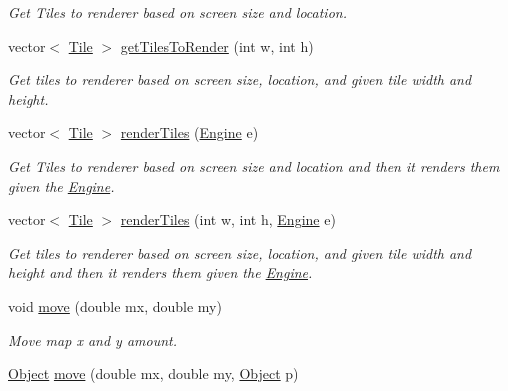 \begin{DoxyCompactItemize}
\begin{DoxyCompactList}\small\item\em Get Tiles to renderer based on screen size and location. \end{DoxyCompactList}\item 
vector$<$ \hyperlink{classTile}{Tile} $>$ \hyperlink{classTilesettmp_a042072ae7290cf0069ff9c776cf34903}{get\+Tiles\+To\+Render} (int w, int h)\hypertarget{classTilesettmp_a042072ae7290cf0069ff9c776cf34903}{}\label{classTilesettmp_a042072ae7290cf0069ff9c776cf34903}

\begin{DoxyCompactList}\small\item\em Get tiles to renderer based on screen size, location, and given tile width and height. \end{DoxyCompactList}\item 
vector$<$ \hyperlink{classTile}{Tile} $>$ \hyperlink{classTilesettmp_affbc3d29043e16afb7f99a4f3ec1dba8}{render\+Tiles} (\hyperlink{classEngine}{Engine} e)\hypertarget{classTilesettmp_affbc3d29043e16afb7f99a4f3ec1dba8}{}\label{classTilesettmp_affbc3d29043e16afb7f99a4f3ec1dba8}

\begin{DoxyCompactList}\small\item\em Get Tiles to renderer based on screen size and location and then it renders them given the \hyperlink{classEngine}{Engine}. \end{DoxyCompactList}\item 
vector$<$ \hyperlink{classTile}{Tile} $>$ \hyperlink{classTilesettmp_aa4e9a6b46e3d1715205dcbbddfce5e73}{render\+Tiles} (int w, int h, \hyperlink{classEngine}{Engine} e)\hypertarget{classTilesettmp_aa4e9a6b46e3d1715205dcbbddfce5e73}{}\label{classTilesettmp_aa4e9a6b46e3d1715205dcbbddfce5e73}

\begin{DoxyCompactList}\small\item\em Get tiles to renderer based on screen size, location, and given tile width and height and then it renders them given the \hyperlink{classEngine}{Engine}. \end{DoxyCompactList}\item 
void \hyperlink{classTilesettmp_a1db4864fe47ce5c36f1e3822d1d9c19c}{move} (double mx, double my)\hypertarget{classTilesettmp_a1db4864fe47ce5c36f1e3822d1d9c19c}{}\label{classTilesettmp_a1db4864fe47ce5c36f1e3822d1d9c19c}

\begin{DoxyCompactList}\small\item\em Move map x and y amount. \end{DoxyCompactList}\item 
\hyperlink{classObject}{Object} \hyperlink{classTilesettmp_a844814afdd47f4e5b4694d6d255d78df}{move} (double mx, double my, \hyperlink{classObject}{Object} p)\hypertarget{classTilesettmp_a844814afdd47f4e5b4694d6d255d78df}{}\label{classTilesettmp_a844814afdd47f4e5b4694d6d255d78df}


\end{DoxyCompactItemize}
